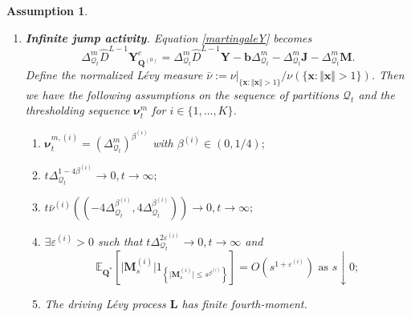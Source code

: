 \documentclass[12pt]{amsart}
\newtheorem{assumption}{Assumption}[section]
\numberwithin{equation}{section}
\newcommand{\E}{\mathbb{E}}
\newcommand{\1}{\mathbf{1}}
\begin{document}
\begin{assumption}
\begin{enumerate}
    \item[(b)] \textbf{Infinite jump activity}. \cite[4.3.2]{lucchese2026estimation}  
    Equation \eqref{martingaleY} becomes
    \begin{equation*}
        \Delta_{\mathcal{Q}_t}^m \hat{D}^{L-1}\mathbf{Y}_{\mathbf{Q}^{(0)}}^{c}
        =
        \Delta_{\mathcal{Q}_t}^m \hat{D}^{L-1}\mathbf{Y}
        -\mathbf{b}\Delta_{\mathcal{Q}_t}^m
        -\Delta_{\mathcal{Q}_t}^m\mathbf{J}
        -\Delta_{\mathcal{Q}_t}^m\mathbf{M}.
    \end{equation*}
    Define the normalized L\'evy measure $\bar{\nu}:=\nu\vert_{\{\mathbf{x}:\Vert \mathbf{x}\Vert>1\}}/\nu(\{\mathbf{x}:\Vert \mathbf{x}\Vert>1\})$. Then we have the following assumptions on the sequence of partitions $\mathcal{Q}_t$ and the thresholding sequence $\bm{\nu}_t^m$ for $i\in\{1,\dots,K\}$.
    \begin{enumerate}
        \item[(i)] $\bm{\nu}_t^{m,(i)}=\left(\Delta^m_{\mathcal{Q}_t}\right)^{\beta^{(i)}}$ with $\beta^{(i)}\in(0,1/4);$
        \item[(ii)] $t\Delta_{\mathcal{Q}_t}^{1-4\beta^{(i)}}\to 0, t\to\infty;$
        \item[(iii)] $t\bar{\nu}^{(i)}\left(\left(-4\Delta_{\mathcal{Q}_t}^{\beta^{(i)}},4\Delta_{\mathcal{Q}_t}^{\beta^{(i)}}\right)\right)\to 0, t\to\infty;$
        \item[(iv)] $\exists\varepsilon^{(i)}>0$ such that $t\Delta_{\mathcal{Q}_t}^{2\varepsilon^{(i)}}\to 0, t\to\infty$ and 
        \begin{equation*}
            \E_{\mathbf{Q}^*}\left[\vert\mathbf{M}_s^{(i)}\vert1_{\left\lbrace\vert\mathbf{M}_s^{(i)}\vert\leq s^{\beta^{(i)}}\right\rbrace}\right]=O\left(s^{1+\varepsilon^{(i)}}\right) \text{ as } s\downarrow 0;
        \end{equation*}
        \item[(v)] The driving L\'evy process $\mathbf{L}$ has finite fourth-moment.
    \end{enumerate}
\end{enumerate}
\end{assumption}
\end{document}
